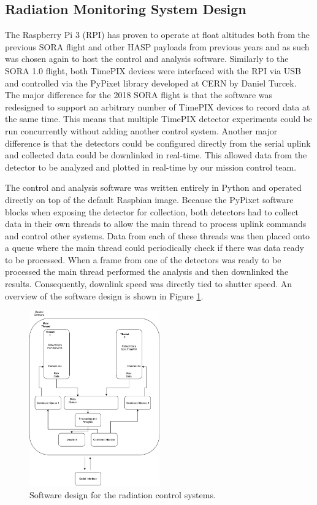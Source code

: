 \subsection{Radiation Monitoring System Design}
\label{sec:Radiation Design}
The Raspberry Pi 3 (RPI) has proven to operate at float altitudes both from the previous SORA flight and other HASP payloads from previous years and as such was chosen again to host the control and analysis software. Similarly to the SORA 1.0 flight, both TimePIX devices were interfaced with the RPI via USB and controlled via the PyPixet library developed at CERN by Daniel Turcek. The major difference for the 2018 SORA flight is that the software was redesigned to support an arbitrary number of TimePIX devices to record data at the same time. This means that multiple TimePIX detector experiments could be run concurrently without adding another control system. Another major difference is that the detectors could be configured directly from the serial uplink and collected data could be downlinked in real-time. This allowed data from the detector to be analyzed and plotted in real-time by our mission control team.

The control and analysis software was written entirely in Python and operated directly on top of the default Raspbian image. Because the PyPixet software blocks when exposing the detector for collection, both detectors had to collect data in their own threads to allow the main thread to process uplink commands and control other systems. Data from each of these threads was then placed onto a queue where the main thread could periodically check if there was data ready to be processed. When a frame from one of the detectors was ready to be processed the main thread performed the analysis and then downlinked the results. Consequently, downlink speed was directly tied to shutter speed. An overview of the software design is shown in 
Figure \ref{fig:softwaredesign}.


\begin{figure}[H]
	\begin{center}
	\includegraphics[width=0.5\textwidth]{figures/SoftwareDesign.pdf}
	\caption{Software design for the radiation control systems.}
	\label{fig:softwaredesign}
	\end{center}
\end{figure}
 
